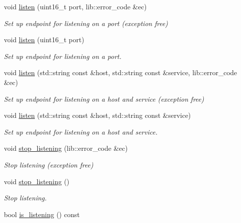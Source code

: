 \begin{DoxyCompactItemize}
void \hyperlink{classwebsocketpp_1_1transport_1_1asio_1_1endpoint_ae7da6e2c944c3e1a087495b9d998dc8b}{listen} (uint16\+\_\+t port, lib\+::error\+\_\+code \&ec)
\begin{DoxyCompactList}\small\item\em Set up endpoint for listening on a port (exception free) \end{DoxyCompactList}\item 
void \hyperlink{classwebsocketpp_1_1transport_1_1asio_1_1endpoint_a80c1e2bb6edbfbfc46d387015e528117}{listen} (uint16\+\_\+t port)
\begin{DoxyCompactList}\small\item\em Set up endpoint for listening on a port. \end{DoxyCompactList}\item 
void \hyperlink{classwebsocketpp_1_1transport_1_1asio_1_1endpoint_a85606665cc9c948194076c2377cb61c0}{listen} (std\+::string const \&host, std\+::string const \&service, lib\+::error\+\_\+code \&ec)
\begin{DoxyCompactList}\small\item\em Set up endpoint for listening on a host and service (exception free) \end{DoxyCompactList}\item 
void \hyperlink{classwebsocketpp_1_1transport_1_1asio_1_1endpoint_ad69ca2f648f48c7616ad1df614d88d67}{listen} (std\+::string const \&host, std\+::string const \&service)
\begin{DoxyCompactList}\small\item\em Set up endpoint for listening on a host and service. \end{DoxyCompactList}\item 
void \hyperlink{classwebsocketpp_1_1transport_1_1asio_1_1endpoint_a0da87d3a3e8ee8279fe59eb0385d81e3}{stop\+\_\+listening} (lib\+::error\+\_\+code \&ec)
\begin{DoxyCompactList}\small\item\em Stop listening (exception free) \end{DoxyCompactList}\item 
void \hyperlink{classwebsocketpp_1_1transport_1_1asio_1_1endpoint_af4ae00e12a34475a1950d69f5b9da507}{stop\+\_\+listening} ()
\begin{DoxyCompactList}\small\item\em Stop listening. \end{DoxyCompactList}\item 
bool \hyperlink{classwebsocketpp_1_1transport_1_1asio_1_1endpoint_af818aa7cc784b77727bd562409a42768}{is\+\_\+listening} () const 

\end{DoxyCompactItemize}
